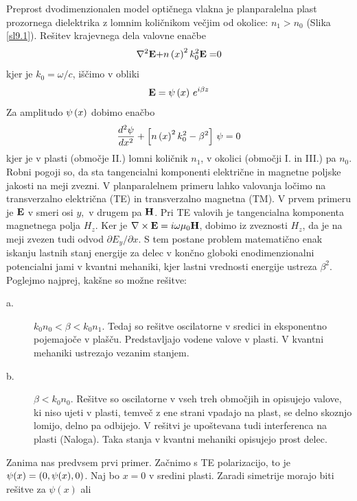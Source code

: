 \documentclass[11pt,fleqn]{book} %
\begin{document}
Preprost dvodimenzionalen model optičnega vlakna je planparalelna
plast prozornega dielektrika z lomnim količnikom večjim od okolice:
$n_{1}>n_{0}$ (Slika \ref{sl9.1}). Rešitev krajevnega dela valovne
enačbe 
\begin{equation}
\nabla^{2}{\bf E+}n\left(x\right)^{2}k_{0}^{2}{\bf E=}0\label{9.1}
\end{equation}
 kjer je $k_{0}=\omega/c$, iščimo v obliki 
\begin{equation}
{\bf E}={\bf \psi}\left(x\right)\, e^{i\beta z}\label{9.2}
\end{equation}
 Za amplitudo ${\bf \psi}\left(x\right)$ dobimo enačbo 
\begin{equation}
\frac{d^{2}{\bf \psi}}{dx^{2}}+\left[n\left(x\right)^{2}k_{0}^{2}-\beta^{2}\right]\,{\bf \psi}=0\label{9.3}
\end{equation}
 kjer je v plasti (območje II.) lomni količnik $n_{1}$, v okolici
(območji I. in III.) pa $n_{0}$. Robni pogoji so, da sta tangencialni
komponenti električne in magnetne poljske jakosti na meji zvezni.
V planparalelnem primeru lahko valovanja ločimo na transverzalno električna
(TE) in transverzalno magnetna (TM). V prvem primeru je ${\bf E}$
v smeri osi $y,$ v drugem pa ${\bf H}$. Pri TE valovih je tangencialna
komponenta magnetnega polja $H_{z}$. Ker je $\nabla\times{\bf E}=i\omega\mu_{0}{\bf H}$,
dobimo iz zveznosti $H_{z}$, da je na meji zvezen tudi odvod $\partial E_{y}/\partial x$.
S tem postane problem matematično enak iskanju lastnih stanj energije
za delec v končno globoki enodimenzionalni potencialni jami v kvantni
mehaniki, kjer lastni vrednosti energije ustreza $\beta^{2}$. Poglejmo
najprej, kakšne so možne rešitve:
\begin{description}
\item [{a.}] $k_{0}n_{0}<\beta<k_{0}n_{1}$. Tedaj so rešitve oscilatorne
v sredici in eksponentno pojemajoče v plašču. Predstavljajo vodene
valove v plasti. V kvantni mehaniki ustrezajo vezanim stanjem.
\item [{b.}] $\beta<k_{0}n_{0}$. Rešitve so oscilatorne v vseh treh območjih
in opisujejo valove, ki niso ujeti v plasti, temveč z ene strani vpadajo
na plast, se delno skoznjo lomijo, delno pa odbijejo. V rešitvi je
upoštevana tudi interferenca na plasti (Naloga). Taka stanja v kvantni
mehaniki opisujejo prost delec. 
\end{description}
Zanima nas predvsem prvi primer. Začnimo s TE polarizacijo, to je
${\bf \psi(}x{\bf )=(}0,\psi(x),0)$. Naj bo $x=0$ v sredini plasti.
Zaradi simetrije morajo biti rešitve za $\psi\left(x\right)$ ali
\end{document}
